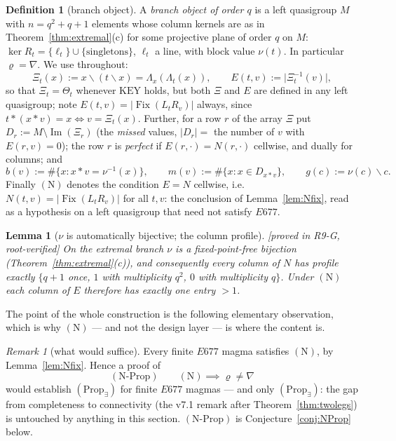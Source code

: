 \documentclass[11pt]{article}
\theoremstyle{plain}
\newtheorem{lemma}[theorem]{Lemma}
\theoremstyle{definition}
\newtheorem{definition}[theorem]{Definition}
\theoremstyle{remark}
\newtheorem*{remark*}{Remark}
\numberwithin{equation}{section}
\newcommand{\op}{\mathbin{*}}
\newcommand{\Fix}{\operatorname{Fix}}
\newcommand{\Imm}{\operatorname{Im}}
\newcommand{\statusbox}[1]{{\small\sloppy\textsf{[#1]}}}
\newcommand{\PROVED}[1]{\statusbox{proved in #1, root-verified}}
\begin{document}
\begin{definition}[branch object]\label{def:branch}
A \emph{branch object of order $q$} is a left quasigroup $M$ with
$n = q^2+q+1$ elements whose column kernels are as in
Theorem~\ref{thm:extremal}(c) for some projective plane of order $q$ on $M$:
$\ker R_t = \{\ell_t\}\cup\{\text{singletons}\}$, $\ell_t$ a line, with block value
$\nu(t)$. In particular $\varrho = \nabla$. We use throughout:
\[
  \Xi_t(x) := x\backslash(t\backslash x) = \Lambda_x(\Lambda_t(x)),\qquad
  E(t,v) := \bigl|\Xi_t^{-1}(v)\bigr| ,
\]
so that $\Xi_t = \Theta_t$ whenever $\mathrm{KEY}$ holds, but both $\Xi$ and $E$
are defined in any left quasigroup; note
$E(t,v) = |\Fix(L_tR_v)|$ always, since $t\op(x\op v) = x\iff v = \Xi_t(x)$.
Further, for a row $r$ of the array $\Xi$ put $D_r := M\setminus\Imm(\Xi_r)$ (the
\emph{missed} values, $|D_r| = $ the number of $v$ with $E(r,v) = 0$); the row $r$
is \emph{perfect} if $E(r,\cdot) = N(r,\cdot)$ cellwise, and dually for columns;
and
\[
  b(v) := \#\{x : x\op v = \nu^{-1}(x)\},\qquad
  m(v) := \#\{x : x\in D_{x\op v}\},\qquad
  g(c) := \nu(c)\backslash c .
\]
Finally $(\mathrm{N})$ denotes the condition $E = N$ cellwise, i.e.\
$N(t,v) = |\Fix(L_tR_v)|$ for all $t,v$: the conclusion of Lemma~\ref{lem:Nfix},
read as a hypothesis on a left quasigroup that need not satisfy $E677$.
\end{definition}

\begin{lemma}[$\nu$ is automatically bijective; the column profile]\label{lem:nubij}
\PROVED{R9-G}
On the extremal branch $\nu$ is a fixed-point-free bijection
(Theorem~\ref{thm:extremal}(c)), and consequently every column of $N$ has profile
exactly $\{q+1$ once, $1$ with multiplicity $q^2$, $0$ with multiplicity $q\}$.
Under $(\mathrm{N})$ each column of $E$ therefore has exactly one entry $>1$.
\end{lemma}

The point of the whole construction is the following elementary observation, which
is why $(\mathrm{N})$ --- and not the design layer --- is where the content is.

\begin{remark*}[what would suffice]
Every finite $E677$ magma satisfies $(\mathrm{N})$, by Lemma~\ref{lem:Nfix}. Hence
a proof of
\[
  (\mathrm{N}\text{-}\mathrm{Prop})\qquad
  (\mathrm{N}) \implies \varrho\ne\nabla
\]
would establish $(\mathrm{Prop}_{\exists})$ for finite $E677$ magmas --- and only
$(\mathrm{Prop}_{\exists})$: the gap from completeness to connectivity
(the v7.1 remark after Theorem~\ref{thm:twolegs}) is untouched by anything in this
section. $(\mathrm{N}\text{-}\mathrm{Prop})$ is Conjecture~\ref{conj:NProp} below.
\end{remark*}
\end{document}
